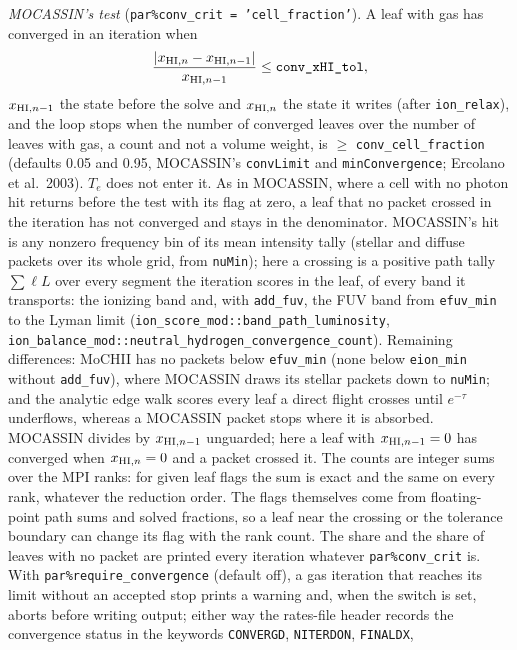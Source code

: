\documentclass[english,a4paper]{my_memo}
\newcommand{\code}[1]{\texttt{#1}}
\begin{document}
\emph{MOCASSIN's test} (\code{par\%conv\_crit = 'cell\_fraction'}).
A leaf with gas has converged in an iteration when
\begin{equation}
  \frac{|x_{{\rm HI},n} - x_{{\rm HI},n-1}|}{x_{{\rm HI},n-1}}
  \le \code{conv\_xHI\_tol},
\end{equation}
$x_{{\rm HI},n-1}$ the state before the solve and $x_{{\rm HI},n}$ the state
it writes (after \code{ion\_relax}), and the loop stops when the number of
converged leaves over the number of leaves with gas, a count and not a
volume weight, is $\ge$ \code{conv\_cell\_fraction} (defaults 0.05 and
0.95, MOCASSIN's \code{convLimit} and \code{minConvergence}; Ercolano et
al.\ 2003).  $T_e$ does not enter it.  As in MOCASSIN, where a cell with
no photon hit returns before the test with its flag at zero, a leaf that
no packet crossed in the iteration has not converged and stays in the
denominator.  MOCASSIN's hit is any nonzero frequency bin of its mean
intensity tally (stellar and diffuse packets over its whole grid, from
\code{nuMin}); here a crossing is a positive path tally $\sum \ell L$
over every segment the iteration scores in the leaf, of every band it
transports: the ionizing band and, with \code{add\_fuv}, the FUV band from
\code{efuv\_min} to the Lyman limit
(\code{ion\_score\_mod::band\_path\_luminosity},
\code{ion\_balance\_mod::neutral\_hydrogen\_convergence\_count}).
Remaining differences: MoCHII has no packets below \code{efuv\_min} (none
below \code{eion\_min} without \code{add\_fuv}), where MOCASSIN draws its
stellar packets down to \code{nuMin}; and the analytic edge walk scores
every leaf a direct flight crosses until $e^{-\tau}$ underflows, whereas a
MOCASSIN packet stops where it is absorbed.  MOCASSIN divides by
$x_{{\rm HI},n-1}$ unguarded; here a leaf with $x_{{\rm HI},n-1} = 0$ has
converged when $x_{{\rm HI},n} = 0$ and a packet crossed it.  The counts
are integer sums over the MPI ranks: for given leaf flags the sum is
exact and the same on every rank, whatever the reduction order.  The flags
themselves come from floating-point path sums and solved fractions, so a
leaf near the crossing or the tolerance boundary can change its flag with
the rank count.  The share and the share of leaves with no
packet are printed every iteration whatever \code{par\%conv\_crit} is.
With \code{par\%require\_convergence} (default off), a gas
iteration that reaches its limit without an accepted stop prints a
warning and, when the switch is set, aborts before
writing output; either way the rates-file header records the convergence
status in the keywords \code{CONVERGD}, \code{NITERDON}, \code{FINALDX},
\end{document}
